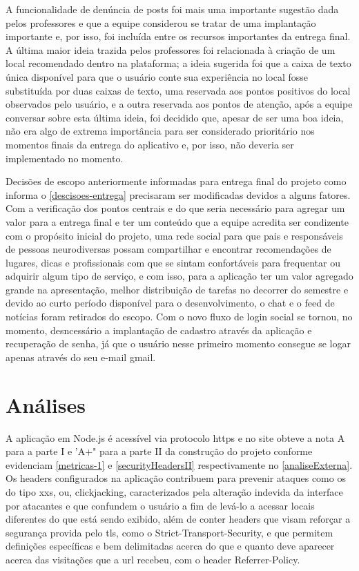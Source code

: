 A funcionalidade de denúncia de posts foi mais uma importante sugestão dada pelos professores e que a equipe considerou se tratar de uma implantação importante e, por isso, foi incluída entre os recursos importantes da entrega final. A última maior ideia trazida pelos professores foi relacionada à criação de um local recomendado dentro na plataforma; a ideia sugerida foi que a caixa de texto única disponível para que o usuário conte sua experiência no local fosse substituída por duas caixas de texto, uma reservada aos pontos positivos do local observados pelo usuário, e a outra reservada aos pontos de atenção, após a equipe conversar sobre esta última ideia, foi decidido que, apesar de ser uma boa ideia, não era algo de extrema importância para ser considerado prioritário nos momentos finais da entrega do aplicativo e, por isso, não deveria ser implementado no momento.

Decisões de escopo anteriormente informadas para entrega final do projeto como informa o \autoref{descisoes-entrega} precisaram ser modificadas devidos a alguns fatores. Com a verificação dos pontos centrais e do que seria necessário para agregar um valor para a entrega final e ter um conteúdo que a equipe acredita ser condizente com o propósito inicial do projeto, uma rede social para que pais e responsáveis de pessoas neurodiversas possam compartilhar e encontrar recomendações de lugares, dicas e profissionais com que se sintam confortáveis para frequentar ou adquirir algum tipo de serviço, e com isso, para a aplicação ter um valor agregado grande na apresentação, melhor distribuição de tarefas no decorrer do semestre e devido ao curto período disponível para o desenvolvimento, o chat e o feed de notícias foram retirados do escopo. Com o novo fluxo de login social se tornou, no momento, desncessário a implantação de cadastro através da aplicação e recuperação de senha, já que o usuário nesse primeiro momento consegue se logar apenas através do seu e-mail gmail.
\section{Análises}

A aplicação em Node.js é acessível via protocolo \ac{https} e no site   obteve a nota A para a parte I e 'A+" para a parte II da construção do projeto conforme evidenciam \autoref{metricas-1} e \autoref{securityHeadersII} respectivamente no \autoref{analiseExterna}. Os headers configurados na aplicação contribuem para prevenir ataques como os do tipo \ac{xxs}, ou, clickjacking,  caracterizados pela alteração indevida da interface por atacantes e que confundem o usuário a fim de levá-lo a acessar locais diferentes do que está sendo exibido, além de conter headers que visam reforçar a segurança provida pelo \ac{tls}, como o Strict-Transport-Security, e que permitem definições específicas e bem delimitadas acerca do que e quanto deve aparecer acerca das visitações que a \ac{url} recebeu, com o header Referrer-Policy. 




